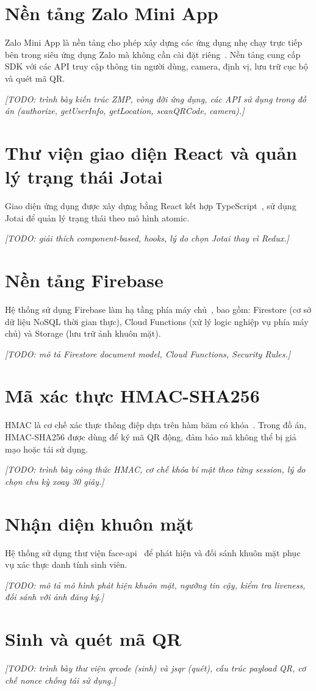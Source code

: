 \documentclass[../main.tex]{subfiles}
\begin{document}
\section{Nền tảng Zalo Mini App}
Zalo Mini App là nền tảng cho phép xây dựng các ứng dụng nhẹ chạy trực tiếp bên trong siêu ứng dụng Zalo mà không cần cài đặt riêng~\cite{zalominiapp}. Nền tảng cung cấp SDK với các API truy cập thông tin người dùng, camera, định vị, lưu trữ cục bộ và quét mã QR.

\textit{[TODO: trình bày kiến trúc ZMP, vòng đời ứng dụng, các API sử dụng trong đồ án (authorize, getUserInfo, getLocation, scanQRCode, camera).]}

\section{Thư viện giao diện React và quản lý trạng thái Jotai}
Giao diện ứng dụng được xây dựng bằng React kết hợp TypeScript~\cite{reactjs}, sử dụng Jotai để quản lý trạng thái theo mô hình atomic.

\textit{[TODO: giải thích component-based, hooks, lý do chọn Jotai thay vì Redux.]}

\section{Nền tảng Firebase}
Hệ thống sử dụng Firebase làm hạ tầng phía máy chủ~\cite{firebase}, bao gồm: Firestore (cơ sở dữ liệu NoSQL thời gian thực), Cloud Functions (xử lý logic nghiệp vụ phía máy chủ) và Storage (lưu trữ ảnh khuôn mặt).

\textit{[TODO: mô tả Firestore document model, Cloud Functions, Security Rules.]}

\section{Mã xác thực HMAC-SHA256}
HMAC là cơ chế xác thực thông điệp dựa trên hàm băm có khóa~\cite{hmacrfc}. Trong đồ án, HMAC-SHA256 được dùng để ký mã QR động, đảm bảo mã không thể bị giả mạo hoặc tái sử dụng.

\textit{[TODO: trình bày công thức HMAC, cơ chế khóa bí mật theo từng session, lý do chọn chu kỳ xoay 30 giây.]}

\section{Nhận diện khuôn mặt}
Hệ thống sử dụng thư viện face-api~\cite{faceapi} để phát hiện và đối sánh khuôn mặt phục vụ xác thực danh tính sinh viên.

\textit{[TODO: mô tả mô hình phát hiện khuôn mặt, ngưỡng tin cậy, kiểm tra liveness, đối sánh với ảnh đăng ký.]}

\section{Sinh và quét mã QR}
\textit{[TODO: trình bày thư viện qrcode (sinh) và jsqr (quét), cấu trúc payload QR, cơ chế nonce chống tái sử dụng.]}
\end{document}
